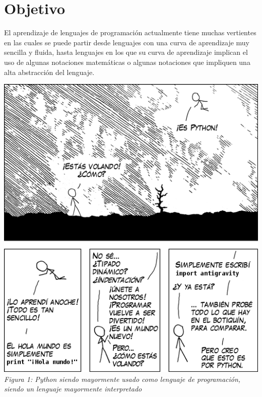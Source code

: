 \documentclass[10pt,executivepaper]{article}
\begin{document}
\section{Objetivo}
El aprendizaje de lenguajes de programación actualmente tiene muchas vertientes en las cuales se puede partir desde lenguajes con una curva de aprendizaje muy sencilla y fluida, hasta lenguajes en los que su curva de aprendizaje implican el uso de algunas notaciones matemáticas o algunas notaciones que impliquen una alta abstracción del lenguaje.
\begin{center}
  \includegraphics[scale=0.7]{imgs/python.png}
  \\\textit{Figura 1: Python siendo mayormente usado como lenguaje de programación, siendo un lenguaje mayormente interpretado}\\

\end{center}
\end{document}
